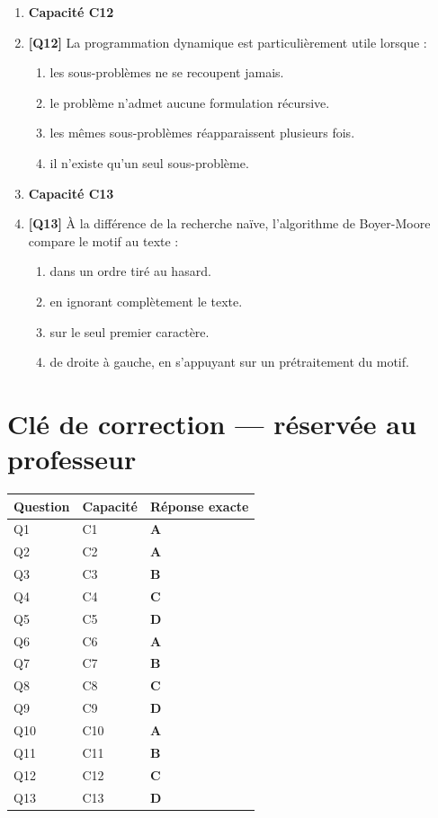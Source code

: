 \begin{enumerate}
\item[] \textbf{Capacité C12}

\item \textbf{[Q12]} La programmation dynamique est particulièrement utile lorsque :
  \begin{enumerate}[label=\Alph*.]
    \item les sous-problèmes ne se recoupent jamais.
    \item le problème n'admet aucune formulation récursive.
    \item les mêmes sous-problèmes réapparaissent plusieurs fois.
    \item il n'existe qu'un seul sous-problème.
  \end{enumerate}

\item[] \textbf{Capacité C13}

\item \textbf{[Q13]} À la différence de la recherche naïve, l'algorithme de Boyer-Moore compare le motif au texte :
  \begin{enumerate}[label=\Alph*.]
    \item dans un ordre tiré au hasard.
    \item en ignorant complètement le texte.
    \item sur le seul premier caractère.
    \item de droite à gauche, en s'appuyant sur un prétraitement du motif.
  \end{enumerate}

\end{enumerate}

\ifnxVersionProfesseur
\clearpage
\section*{Clé de correction — réservée au professeur}

\begin{center}
\begin{tabular}{lll}
\hline
Question & Capacité & Réponse exacte \\
\hline
Q1 & C1 & \textbf{A} \\
Q2 & C2 & \textbf{A} \\
Q3 & C3 & \textbf{B} \\
Q4 & C4 & \textbf{C} \\
Q5 & C5 & \textbf{D} \\
Q6 & C6 & \textbf{A} \\
Q7 & C7 & \textbf{B} \\
Q8 & C8 & \textbf{C} \\
Q9 & C9 & \textbf{D} \\
Q10 & C10 & \textbf{A} \\
Q11 & C11 & \textbf{B} \\
Q12 & C12 & \textbf{C} \\
Q13 & C13 & \textbf{D} \\
\hline
\end{tabular}
\end{center}


